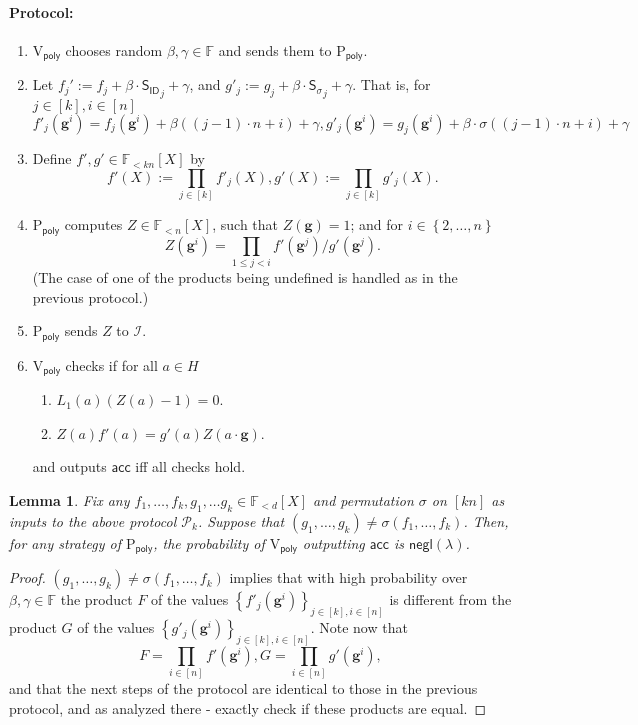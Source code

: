 \documentclass[11pt]{article} %
\newcommand{\F}{\ensuremath{\mathbb F}\xspace}
\newcommand{\sigof}[1]{\ensuremath{\sigma(#1)}\xspace}
\newcommand{\proverexp}{\ensuremath{\mathsf{e}}\xspace}
\newcommand{\negl}{\ensuremath{\mathsf{negl}(\lambda)}\xspace}
\newcommand{\acc}{\ensuremath{\mathsf{acc}}\xspace}
\newcommand{\defeq}{:=}
\newcommand{\dom}{\ensuremath{H}\xspace}
\newcommand{\sett}[2]{\ensuremath{\set{#1}_{#2}}\xspace}
\newcommand{\prvpoly}{\ensuremath{\mathrm{P_{\mathsf{poly}}}}\xspace}
\newcommand{\verpoly}{\ensuremath{\mathrm{V_{\mathsf{poly}}}}\xspace}
\newcommand{\ideal}{\ensuremath{\mathcal{I}}\xspace}
\newcommand{\set}[1]{\ensuremath{\left\{#1\right\}}\xspace}
\newcommand{\hgen}{\ensuremath{\mathbf{g}}\xspace}
\newcommand{\polysofdeg}[1]{\ensuremath{\F_{< #1}[X]}\xspace}
\newcommand{\prot}{\ensuremath{\mathscr{P}}\xspace}
\newcommand{\sigpoly}{\ensuremath{\mathsf{S_{\sigma}}}\xspace}
\newcommand{\idpoly}{\ensuremath{\mathsf{S_{ID}}}\xspace}
\newtheorem{lemma}{Lemma}[section]
\newcommand{\protmany}{\ensuremath{ {\prot}_k}\xspace}
\begin{document}
\paragraph{Protocol:}
\begin{enumerate}
 \item\label{item:betgamma} \verpoly chooses random $\beta,\gamma \in\F$ and sends them to \prvpoly.
 \item Let $f_j'\defeq f_j+\beta\cdot  \idpoly_j +\gamma$, and $ g'_j\defeq g_j+\beta\cdot \sigpoly_j + \gamma$.
That is, for $j\in [k],i\in [n]$
 \[f'_j(\hgen^i) = f_j(\hgen^i) + \beta((j-1)\cdot n + i) + \gamma,
 g'_j(\hgen^i) = g_j(\hgen^i) + \beta\cdot \sigma((j-1)\cdot n + i) + \gamma\]
\item Define $f',g' \in \polysofdeg{kn}$ by 
\[f'(X) \defeq \prod_{j\in [k]} f'_j(X),g'(X) \defeq \prod_{j\in [k]} g'_j(X).\]
 
 \item \prvpoly computes $Z \in \polysofdeg{n}$, such that 
 $Z(\hgen) =1$; and for $i\in \set{2,\ldots,n}$
 \[Z(\hgen^i)  = \prod_{1\leq j <i} f'(\hgen^j)/g'(\hgen^j).\]
 (The case of one of the products being undefined is handled as in the previous protocol.)
 
 
 \item \prvpoly sends $Z$ to \ideal.
 \item \verpoly checks if for all $a\in \dom$
 \begin{enumerate}
  \item $L_1(a) (Z(a)-1) =0$.
  \item $Z(a)f'(a) = g'(a)Z(a\cdot \hgen)$.
 \end{enumerate}
 and outputs \acc iff all checks hold.
\end{enumerate}
\begin{lemma}\label{lem:permprotocolmany}
Fix any $f_1,\ldots,f_k,g_1,\ldots g_k \in \polysofdeg{d}$ and permutation $\sigma$ on $[kn]$ as inputs to the above protocol \protmany.
Suppose that $(g_1,\ldots,g_k) \neq \sigof{f_1,\ldots,f_k}$.
Then, for any strategy of \prvpoly, the probability of \verpoly outputting \acc is \negl.

\end{lemma}
\begin{proof}
 $(g_1,\ldots,g_k) \neq \sigof{f_1,\ldots,f_k}$ implies that with high probability over $\beta,\gamma \in \F$ the product $F$ of the values 
 \sett{f'_j(\hgen^i)}{j\in [k],i\in [n]} is different from the product $G$ of the values
 \sett{g'_j(\hgen^i)}{j\in [k],i\in [n]}.
 Note now that 
    \[F=\prod_{i\in [n]} f'(\hgen^i), G=\prod_{i\in [n]} g'(\hgen^i),\]
 and that the next steps of the protocol are identical to those in the previous protocol,
 and as analyzed there - exactly check if these products are equal.
\end{proof}
\end{document}
